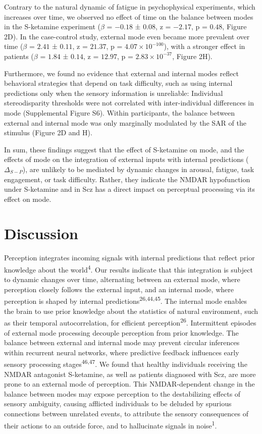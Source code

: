 \documentclass[
]{article}
\begin{document}
Contrary to the natural dynamic of fatigue in psychophysical
experiments, which increases over time, we observed no effect of time on
the balance between modes in the S-ketamine experiment (\(\beta\) =
\(-0.18\) ± \(0.08\), z = \(-2.17\), p = \(0.48\), Figure 2D). In the
case-control study, external mode even became more prevalent over time
(\(\beta\) = \(2.41\) ± \(0.11\), z = \(21.37\), p =
\(\ensuremath{4.07\times 10^{-100}}\)), with a stronger effect in
patients (\(\beta\) = \(1.84\) ± \(0.14\), z = \(12.97\), p =
\(\ensuremath{2.83\times 10^{-37}}\), Figure 2H).

Furthermore, we found no evidence that external and internal modes
reflect behavioral strategies that depend on task difficulty, such as
using internal predictions only when the sensory information is
unreliable: Individual stereodisparity thresholds were not correlated
with inter-individual differences in mode (Supplemental Figure S6).
Within participants, the balance between external and internal mode was
only marginally modulated by the SAR of the stimulus (Figure 2D and H).

In sum, these findings suggest that the effect of S-ketamine on mode,
and the effects of mode on the integration of external inputs with
internal predictions (\(\Delta_{S-P}\)), are unlikely to be mediated by
dynamic changes in arousal, fatigue, task engagement, or task
difficulty. Rather, they indicate the NMDAR hypofunction under
S-ketamine and in Scz has a direct impact on perceptual processing via
its effect on mode.

\section{Discussion}\label{discussion}

Perception integrates incoming signals with internal predictions that
reflect prior knowledge about the world\textsuperscript{4}. Our results
indicate that this integration is subject to dynamic changes over time,
alternating between an external mode, where perception closely follows
the external input, and an internal mode, where perception is shaped by
internal predictions\textsuperscript{26,44,45}. The internal mode
enables the brain to use prior knowledge about the statistics of natural
environment, such as their temporal autocorrelation, for efficient
perception\textsuperscript{26}. Intermittent episodes of external mode
processing decouple perception from prior knowledge. The balance between
external and internal mode may prevent circular inferences within
recurrent neural networks, where predictive feedback influences early
sensory processing stages\textsuperscript{46,47}. We found that healthy
individuals receiving the NMDAR antagonist S-ketamine, as well as
patients diagnosed with Scz, are more prone to an external mode of
perception. This NMDAR-dependent change in the balance between modes may
expose perception to the destabilizing effects of sensory ambiguity,
causing afflicted individuals to be deluded by spurious connections
between unrelated events, to attribute the sensory consequences of their
actions to an outside force, and to hallucinate signals in
noise\textsuperscript{1}.
\end{document}
